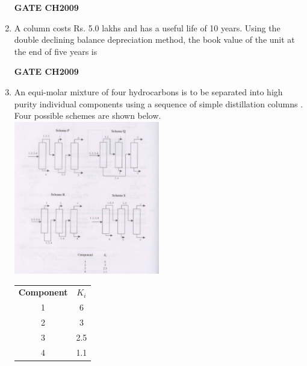 \documentclass[journal,12pt,onecolumn]{IEEEtran}
\theoremstyle{remark}
\begin{document}
\begin{enumerate}
		\hfill
		\textbf{GATE CH2009} 
		
		
		\item A column costs Rs. 5.0 lakhs and has a useful life of 10 years. Using the double declining balance depreciation method, the book value of the unit at the end of five years  is 
		\begin{enumerate}
		\end{enumerate} 
		
		\hfill
		\textbf{GATE CH2009} 
		
		\item An equi-molar mixture of four hydrocarbons  is to be separated into high purity individual components using a sequence of simple distillation columns . Four possible schemes are shown below.
		\\ \includegraphics[width=0.5\textwidth]{q46.png} 
		\begin{center}
			\begin{tabular}{ c c }
				\textbf{Component} &\textbf{$K_{i}$} \\
				1 & 6 \\
				2 & 3 \\
				3 & 2.5 \\
				4 & 1.1
			\end{tabular}
		\end{center} 
		
		\begin{enumerate}
			\begin{multicols}{4}
				\item P
				\item Q
				\item R
				\item S
			\end{multicols}
		\end{enumerate} 
		

\end{enumerate}
\end{document}
